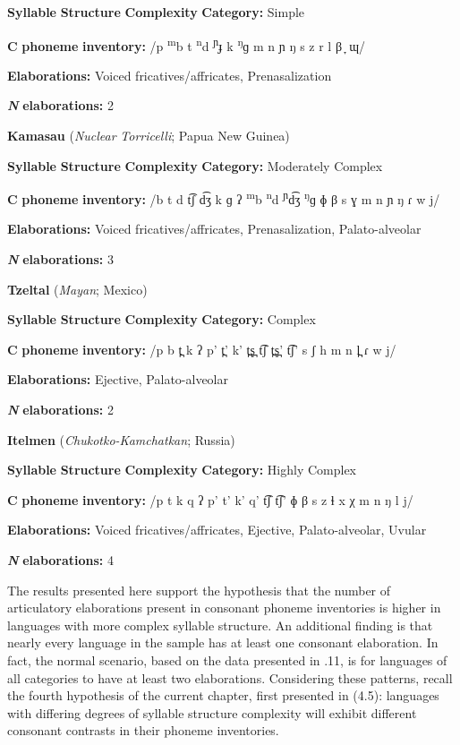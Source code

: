 \textbf{Syllable} \textbf{Structure} \textbf{Complexity} \textbf{Category:} Simple

\textbf{C} \textbf{phoneme} \textbf{inventory:} /p \textsuperscript{m}b t \textsuperscript{n}d \textsuperscript{ɲ}ɟ k \textsuperscript{ŋ}ɡ m n ɲ ŋ s z r l β ̞ ɰ/

\textbf{Elaborations:} Voiced fricatives/affricates, Prenasalization

\textbf{\textit{N}} \textbf{elaborations:} 2

\z

\ea\label{ex:(4.29)}
  \textbf{Kamasau} (\textit{Nuclear} \textit{Torricelli}; Papua New Guinea)

\textbf{Syllable} \textbf{Structure} \textbf{Complexity} \textbf{Category:} Moderately Complex

\textbf{C} \textbf{phoneme} \textbf{inventory:} /b t d t͡ʃ d͡ʒ k ɡ ʔ \textsuperscript{m}b \textsuperscript{n}d \textsuperscript{ɲ}d͡ʒ \textsuperscript{ŋ}ɡ ɸ β s ɣ m n ɲ ŋ ɾ w j/

\textbf{Elaborations:} Voiced fricatives/affricates, Prenasalization, Palato-alveolar

\textbf{\textit{N}} \textbf{elaborations:} 3

\z

\ea\label{ex:(4.30)}
  \textbf{Tzeltal} (\textit{Mayan}; Mexico)

\textbf{Syllable} \textbf{Structure} \textbf{Complexity} \textbf{Category:} Complex

\textbf{C} \textbf{phoneme} \textbf{inventory:} /p b t̪ k ʔ p’ t̪’ k’ t̪s̪ t͡ʃ t̪s̪’ t͡ʃ’ s ʃ h m n l̪ ɾ w j/ 

\textbf{Elaborations:} Ejective, Palato-alveolar

\textbf{\textit{N}} \textbf{elaborations:} 2

\z

\ea\label{ex:(4.31)}
  \textbf{Itelmen} (\textit{Chukotko-Kamchatkan}; Russia)

\textbf{Syllable} \textbf{Structure} \textbf{Complexity} \textbf{Category:} Highly Complex

\textbf{C} \textbf{phoneme} \textbf{inventory:} /p t k q ʔ p’ t’ k’ q’ t͡ʃ t͡ʃ’ ɸ β s z ɬ x χ m n ŋ l j/

\textbf{Elaborations:} Voiced fricatives/affricates, Ejective, Palato-alveolar, Uvular 

\textbf{\textit{N}} \textbf{elaborations:} 4

\z

  The results presented here support the hypothesis that the number of articulatory elaborations present in consonant phoneme inventories is higher in languages with more complex syllable structure. An additional finding is that nearly every language in the sample has at least one consonant elaboration. In fact, the normal scenario, based on the data presented in .11, is for languages of all categories to have at least two elaborations. Considering these patterns, recall the fourth hypothesis of the current chapter, first presented in (4.5): languages with differing degrees of syllable structure complexity will exhibit different consonant contrasts in their phoneme inventories.

